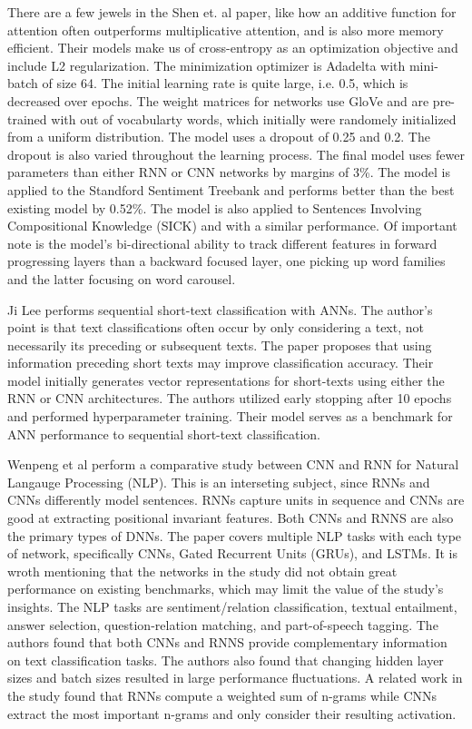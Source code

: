 There are a few jewels in the Shen et. al paper, like how an additive function for attention often outperforms multiplicative attention, and is also more memory efficient.  Their models make us of cross-entropy as an optimization objective and include L2 regularization.  The minimization optimizer is Adadelta with mini-batch of size 64.  The initial learning rate is quite large, i.e. 0.5, which is decreased over epochs.  The weight matrices for networks use GloVe and are pre-trained with out of vocabularty words, which initially were randomely initialized from a uniform distribution.  The model uses a dropout of 0.25 and 0.2.  The dropout is also varied throughout the learning process.  The final model uses fewer parameters than either RNN or CNN networks by margins of 3\%.  The model is applied to the Standford Sentiment Treebank and performs better than the best existing model by 0.52\%.  The model is also applied to Sentences Involving Compositional Knowledge (SICK) and with a similar performance.  Of important note is the model's bi-directional ability to track different features in forward progressing layers than a backward focused layer, one picking up word families and the latter focusing on word carousel.


Ji Lee performs sequential short-text classification with ANNs. The author's point is that text classifications often occur by only considering a text, not necessarily its preceding or subsequent texts.  The paper proposes that using information preceding short texts may improve classification accuracy.  Their model initially generates vector representations for short-texts using either the RNN or CNN architectures.  The authors utilized early stopping after 10 epochs and performed hyperparameter training.  Their model serves as a benchmark for ANN performance to sequential short-text classification.

Wenpeng et al perform a comparative study between CNN and RNN for Natural Langauge Processing (NLP).  This is an interseting subject, since RNNs and CNNs differently model sentences.  RNNs capture units in sequence and CNNs are good at extracting positional invariant features.  Both CNNs and RNNS are also the primary types of DNNs.  The paper covers multiple NLP tasks with each type of network, specifically CNNs, Gated Recurrent Units (GRUs), and LSTMs.  It is wroth mentioning that the networks in the study did not obtain great performance on existing benchmarks, which may limit the value of the study's insights.  The NLP tasks are sentiment/relation classification, textual entailment, answer selection, question-relation matching, and part-of-speech tagging.  The authors found that both CNNs and RNNS provide complementary information on text classification tasks.  The authors also found that changing hidden layer sizes and batch sizes resulted in large performance fluctuations.  A related work in the study found that RNNs compute a weighted sum of n-grams while CNNs extract the most important n-grams and only consider their resulting activation.

